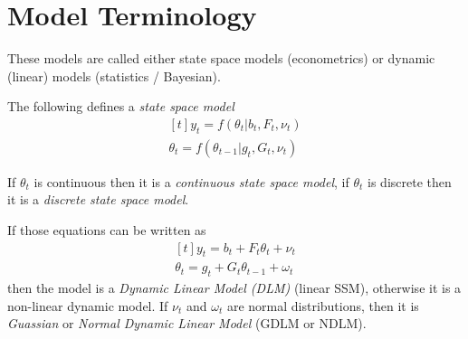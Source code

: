 \documentclass{article}\usepackage[]{graphicx}\usepackage[]{color}
\makeatletter
\newenvironment{kframe}{%
 \def\at@end@of@kframe{}%
 \ifinner\ifhmode%
  \def\at@end@of@kframe{\end{minipage}}%
  \begin{minipage}{\columnwidth}%
 \fi\fi%
 \def\FrameCommand##1{\hskip\@totalleftmargin \hskip-\fboxsep
 \colorbox{shadecolor}{##1}\hskip-\fboxsep
     \hskip-\linewidth \hskip-\@totalleftmargin \hskip\columnwidth}%
 \MakeFramed {\advance\hsize-\width
   \@totalleftmargin\z@ \linewidth\hsize
   \@setminipage}}%
 {\par\unskip\endMakeFramed%
 \at@end@of@kframe}
\newenvironment{knitrout}{}{} %
\makeatother
\begin{document}
\begin{knitrout}
\color{fgcolor}\begin{kframe}


{\ttfamily\noindent\itshape\color{messagecolor}{\#\# Loading required package: Rcpp\\\#\# Loading required package: inline\\\#\# Loading required package: methods\\\#\# \\\#\# Attaching package: 'inline'\\\#\# \\\#\# The following object is masked from 'package:Rcpp':\\\#\# \\\#\#\ \ \ \  registerPlugin\\\#\# \\\#\# rstan (Version 2.2.0, packaged: 2014-05-13 20:40:04 UTC)}}\end{kframe}
\end{knitrout}


\section{Model Terminology}

These models are called either state space models (econometrics) or
dynamic (linear) models (statistics / Bayesian).

The following defines a \emph{state space model} 
\begin{equation*}
  \begin{aligned}[t]
    y_t = f(\theta_t \vert  b_{t}, F_t, \nu_t) \\
    \theta_t = f(\theta_{t-1} \vert g_{t},  G_t, \nu_t)
  \end{aligned}
\end{equation*}

If $\theta_t$ is continuous then it is a \emph{continuous state space
model}, if $\theta_t$ is discrete then it is a \emph{discrete state
space model}.

If those equations can be written as 
\begin{equation*}
\begin{aligned}[t]
y_t = b_{t} + F_t \theta_t + \nu_t \\
\theta_t = g_{t} + G_t \theta_{t-1} + \omega_t
\end{aligned}
\end{equation*}
then the model is a \emph{Dynamic Linear Model (DLM)} (linear SSM), otherwise it is a non-linear dynamic model.
If $\nu_t$ and $\omega_t$ are normal distributions, then it is \emph{Guassian} or \emph{Normal Dynamic Linear Model} (GDLM or NDLM). 
\end{document}

